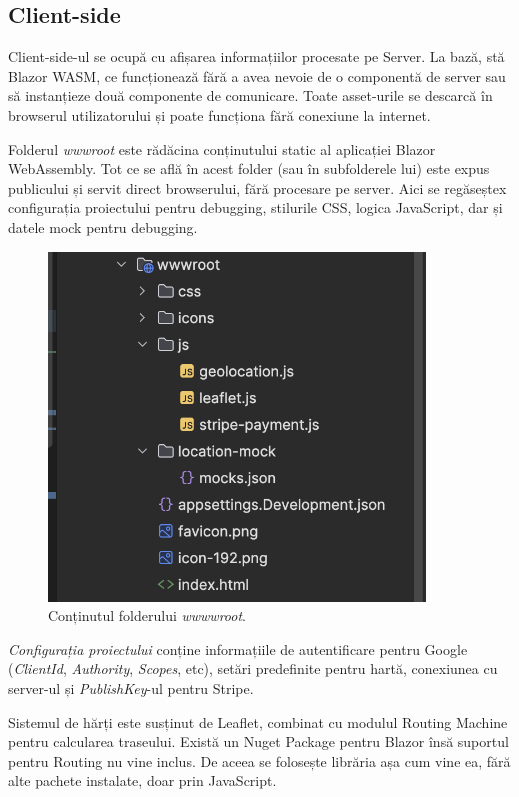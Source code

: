 \subsection{Client-side}

Client-side-ul se ocupă cu afișarea informațiilor procesate pe Server. La bază, stă
Blazor WASM, ce funcționează fără a avea nevoie de o componentă de server sau să instanțieze
două componente de comunicare. Toate asset-urile se descarcă în browserul utilizatorului și poate funcționa fără conexiune la internet.

Folderul \textit{wwwroot} este rădăcina conținutului static al aplicației Blazor WebAssembly. 
Tot ce se află în acest folder (sau în subfolderele lui) este expus publicului și servit direct browserului, fără procesare pe server.
Aici se regăseștex configurația proiectului pentru debugging, stilurile CSS, logica JavaScript, dar și datele mock pentru debugging.

\begin{figure}[H]
    \centering
    \includegraphics[width=10cm]{Assets/wwwroot.png}
    \caption{Conținutul folderului \textit{wwwwroot}.}
    \label{fig:wwwroot}
\end{figure}

\textit{Configurația proiectului} conține informațiile de autentificare pentru Google (\textit{ClientId}, \textit{Authority}, \textit{Scopes}, etc),
setări predefinite pentru hartă, conexiunea cu server-ul și \textit{PublishKey}-ul pentru Stripe.

Sistemul de hărți este susținut de Leaflet, combinat cu modulul Routing Machine pentru calcularea traseului.
Există un Nuget Package pentru Blazor însă suportul pentru Routing nu vine inclus. De aceea se folosește librăria așa
cum vine ea, fără alte pachete instalate, doar prin JavaScript.

